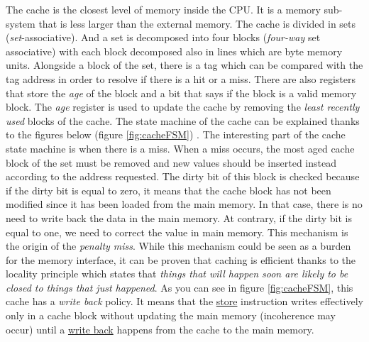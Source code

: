 \documentclass[10pt,letterpaper]{article}
\begin{document}
The cache is the closest level of memory inside the CPU. It is a memory sub-system that is less larger than the external memory. The cache is divided in sets (\textit{set}-associative). And a set is decomposed into four blocks (\textit{four-way} set associative) with each block decomposed also in lines which are byte memory units. Alongside a block of the set, there is a tag which can be compared with the tag address in order to resolve if there is a hit or a miss. There are also registers that store the \textit{age} of the block and a bit that says if the block is a valid memory block. The \textit{age} register is used to update the cache by removing the \textit{least recently used} blocks of the cache. The state machine of the cache can be explained thanks to the figures below (figure \ref{fig:cacheFSM}) . The interesting part of the cache state machine is when there is a miss. When a miss occurs, the most aged cache block of the set must be removed and new values should be inserted instead according to the address requested. The dirty bit of this block is checked because if the dirty bit is equal to zero, it means that the cache block has not been modified since it has been loaded from the main memory. In that case, there is no need to write back the data in the main memory. At contrary, if the dirty bit is equal to one, we need to correct the value in main memory. This mechanism is the origin of the \textit{penalty miss}. While this mechanism could be seen as a burden for the memory interface, it can be proven that caching is efficient thanks to the locality principle which states that \textit{things that will happen soon are likely to be closed to things that just happened}. As you can see in figure \ref{fig:cacheFSM}, this cache has a \textit{write back} policy. It means that the \underline{store} instruction writes effectively only in a cache block without updating the main memory (incoherence may occur) until a \underline{write back} happens from the cache to the main memory.
\end{document}
